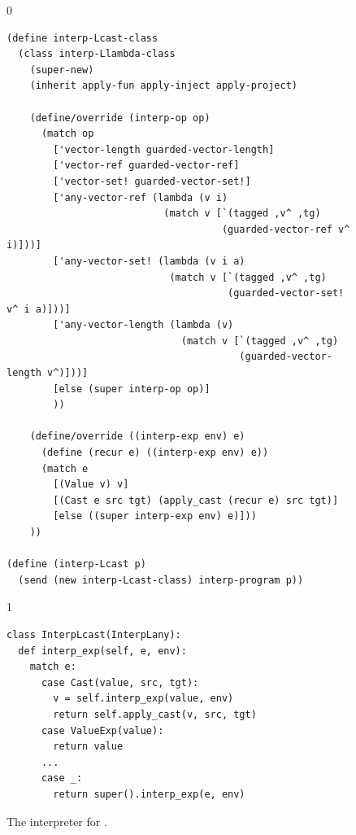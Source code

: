 \documentclass[7x10]{TimesAPriori_MIT}%
\def\racketEd{0}
\def\pythonEd{1}
\providecommand{\BookEdition}{1}
\let\edition\BookEdition
\newcommand{\pythonColor}[0]{}
\numberwithin{theorem}{chapter}
\numberwithin{definition}{chapter}
\numberwithin{equation}{chapter}
\begin{document}
\begin{figure}[tbp]
\begin{tcolorbox}[colback=white]  
{\if\edition\racketEd    
\begin{lstlisting}[basicstyle=\ttfamily\footnotesize]
(define interp-Lcast-class
  (class interp-Llambda-class
    (super-new)
    (inherit apply-fun apply-inject apply-project)

    (define/override (interp-op op)
      (match op
        ['vector-length guarded-vector-length]
        ['vector-ref guarded-vector-ref]
        ['vector-set! guarded-vector-set!]
        ['any-vector-ref (lambda (v i)
                           (match v [`(tagged ,v^ ,tg)
                                     (guarded-vector-ref v^ i)]))]
        ['any-vector-set! (lambda (v i a)
                            (match v [`(tagged ,v^ ,tg)
                                      (guarded-vector-set! v^ i a)]))]
        ['any-vector-length (lambda (v)
                              (match v [`(tagged ,v^ ,tg)
                                        (guarded-vector-length v^)]))]
        [else (super interp-op op)]
        ))

    (define/override ((interp-exp env) e)
      (define (recur e) ((interp-exp env) e))
      (match e
        [(Value v) v]
        [(Cast e src tgt) (apply_cast (recur e) src tgt)]
        [else ((super interp-exp env) e)]))
    ))

(define (interp-Lcast p)
  (send (new interp-Lcast-class) interp-program p))
\end{lstlisting}
\fi}
{\if\edition\pythonEd\pythonColor
\begin{lstlisting}[basicstyle=\ttfamily\footnotesize]
class InterpLcast(InterpLany):
  def interp_exp(self, e, env):
    match e:
      case Cast(value, src, tgt):
        v = self.interp_exp(value, env)
        return self.apply_cast(v, src, tgt)
      case ValueExp(value):
        return value
      ...
      case _:
        return super().interp_exp(e, env)
\end{lstlisting}
\fi}
\end{tcolorbox}

\caption{The interpreter for \LangCast{}.}
  \label{fig:interp-Lcast}
\end{figure}
\end{document}
